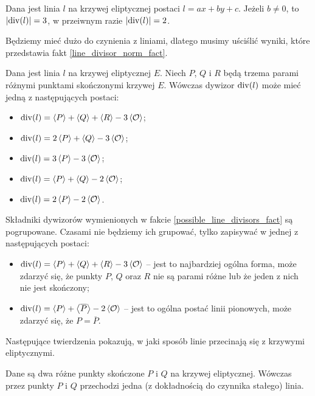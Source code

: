 \begin{fact}\label{line_divisor_norm_fact}
Dana jest linia $l$ na krzywej eliptycznej postaci $l = ax + by + c$.
Jeżeli $b \neq 0$, to $\lvert\operatorname{div}(l)\rvert = 3$,
w przeiwnym razie $\lvert\operatorname{div}(l)\rvert = 2$.
\end{fact}

\noindent
Będziemy mieć dużo do czynienia z liniami,
dlatego musimy uściślić wyniki,
które przedstawia fakt \ref{line_divisor_norm_fact}.

\begin{fact}\label{possible_line_divisors_fact}
Dana jest linia $l$ na krzywej eliptycznej $E$.
Niech $P$, $Q$ i $R$ będą
trzema parami różnymi punktami skończonymi krzywej $E$.
Wówczas dywizor $\operatorname{div}(l)$ może mieć jedną z następujących postaci:
\begin{itemize}
\item $\operatorname{div}(l) = \left\langle P\right\rangle + \left\langle Q\right\rangle + \left\langle R\right\rangle - 3\left\langle\mathcal{O}\right\rangle$;
\item $\operatorname{div}(l) = 2\left\langle P\right\rangle + \left\langle Q\right\rangle - 3\left\langle\mathcal{O}\right\rangle$;
\item $\operatorname{div}(l) = 3\left\langle P\right\rangle - 3\left\langle\mathcal{O}\right\rangle$;
\item $\operatorname{div}(l) = \left\langle P\right\rangle + \left\langle Q\right\rangle - 2\left\langle\mathcal{O}\right\rangle$;
\item $\operatorname{div}(l) = 2\left\langle P\right\rangle - 2\left\langle\mathcal{O}\right\rangle$.
\end{itemize}
\end{fact}

\begin{remark}\label{possible_line_divisors_remark}
Składniki dywizorów wymienionych w fakcie \ref{possible_line_divisors_fact}
są pogrupowane. Czasami nie będziemy ich grupować,
tylko zapisywać w jednej z następujących postaci:
\begin{itemize}
\item $\operatorname{div}(l) = \left\langle P\right\rangle + \left\langle Q\right\rangle + \left\langle R\right\rangle - 3\left\langle\mathcal{O}\right\rangle$ --
jest to najbardziej ogólna forma,
może zdarzyć się, że punkty $P$, $Q$ oraz $R$ nie są parami różne
lub że jeden z nich nie jest skończony;
\item $\operatorname{div}(l) = \left\langle P\right\rangle + \left\langle\overline{P}\right\rangle - 2\left\langle\mathcal{O}\right\rangle$ --
jest to ogólna postać linii pionowych,
może zdarzyć się, że $P = \overline{P}$.
\end{itemize}
\end{remark}

\noindent
Następujące twierdzenia pokazują,
w jaki sposób linie przecinają się z krzywymi eliptycznymi.

\begin{theorem}\label{line_through_two_points_theorem}
Dane są dwa różne punkty skończone $P$ i $Q$ na krzywej eliptycznej.
Wówczas przez punkty $P$ i $Q$
przechodzi jedna (z dokładnością do czynnika stałego) linia.
\end{theorem}

